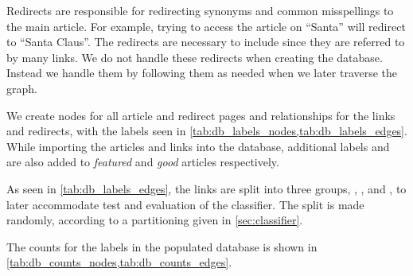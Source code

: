 Redirects are responsible for redirecting synonyms and common misspellings to the main article. For example, trying to access the article on ``Santa'' will redirect to ``Santa Claus''. The redirects are necessary to include since they are referred to by many links. We do not handle these redirects when creating the database. Instead we handle them by following them as needed when we later traverse the graph.


We create nodes for all article and redirect pages and relationships for the links and redirects, with the labels seen in \cref{tab:db_labels_nodes,tab:db_labels_edges}. While importing the articles and links into the database, additional labels  and  are also added to  \emph{featured} and \emph{good} articles respectively.

As seen in \cref{tab:db_labels_edges}, the links are split into three groups, , , and , to later accommodate test and evaluation of the classifier. The split is made randomly, according to a partitioning given in \cref{sec:classifier}.

The counts for the labels in the populated database is shown in \cref{tab:db_counts_nodes,tab:db_counts_edges}.


